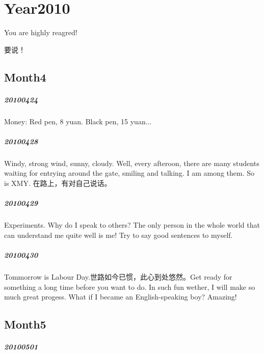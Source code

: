 \documentclass[UTF8]{Diaries}
\begin{document}
\chapter{Year2010}

You are highly reagred!

要说！



\section{Month4}

\paragraph{20100424}

Money: Red pen, 8 yuan. Black pen, 15 yuan...


\paragraph{20100428}

Windy, strong wind, sunny, cloudy. 
Well, every afteroon, there are many students waiting for entrying around the gate, smiling and talking. I am among them. So is XMY.
在路上，有对自己说话。


\paragraph{20100429}

Experiments. Why do I speak to others? The only person in the whole world that can understand me quite well is me! Try to say good sentences to myself.


\paragraph{20100430}

Tommorrow is Labour Day.世路如今已惯，此心到处悠然。Get ready for something a long time before you want to do. In such fun wether, I will make so much great progess. What if I became an English-speaking boy? Amazing!


\section{Month5}
\paragraph{20100501}
\end{document}
